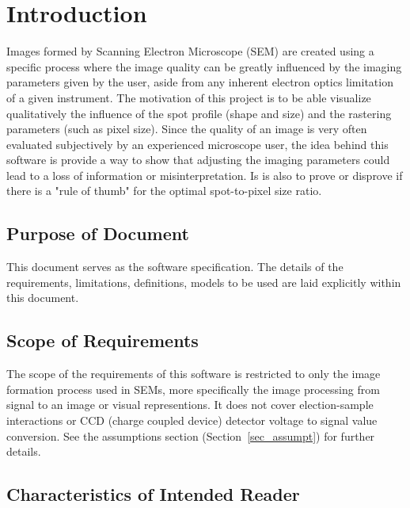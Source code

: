 \documentclass[12pt]{article}
\begin{document}

\section{Introduction}

Images formed by Scanning Electron Microscope (SEM) are created using a 
specific process where the image quality can be greatly influenced by the 
imaging parameters given by the user, aside from any inherent electron 
optics limitation of a given instrument. The motivation of this project is 
to be able visualize qualitatively the influence of the spot profile 
(shape and size) and the rastering parameters (such as pixel size). Since the 
quality of an image is very often evaluated subjectively by an experienced 
microscope user, the idea behind this software is provide a way to show 
that adjusting the imaging parameters could lead to a loss of information 
or misinterpretation. Is is also to prove or disprove if there is a "rule 
of thumb" for the optimal spot-to-pixel size ratio.

\subsection{Purpose of Document}

This document serves as the software specification. The details of the 
requirements, limitations, definitions, models to be used are laid explicitly 
within this document.

\subsection{Scope of Requirements} 

The scope of the requirements of this software is restricted to only the image 
formation process used in SEMs, more specifically the image processing from 
signal to an image or visual representions. It does not cover election-sample 
interactions or CCD (charge coupled device) detector voltage to signal value 
conversion. See the assumptions section (Section~\ref{sec_assumpt}) for further 
details.

\subsection{Characteristics of Intended Reader} \label{sec_IntendedReader}
\end{document}

